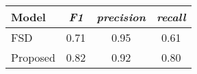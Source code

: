 \begin{tabular}{|l|ccc|}
\hline
\textbf{Model} & \textit{F1} & \textit{precision} & \textit{recall} \\
\hline
           FSD &        0.71 &               0.95 &            0.61 \\
      Proposed &        0.82 &               0.92 &            0.80 \\
\hline
\end{tabular}
